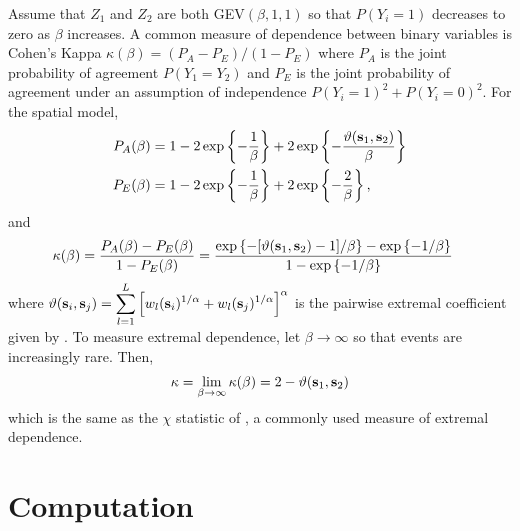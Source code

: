 \documentclass[12pt]{article}
\begin{document}
Assume that $Z_1$ and $Z_2$ are both GEV$(\beta, 1, 1)$ so that $P(Y_i = 1)$ decreases to zero as $\beta$ increases.
A common measure of dependence between binary variables is Cohen's Kappa \citep{Cohen1960} $\kappa(\beta) = (P_A - P_E) / (1 - P_E)$ where $P_A$ is the joint probability of agreement $P(Y_1 = Y_2)$ and $P_E$ is the joint probability of agreement under an assumption of independence $P(Y_i = 1)^2 + P(Y_i = 0)^2$.
For the spatial model,
\begin{align*}
P_A(\beta) &= 1 - 2 \exp\left\{ - \frac{1}{\beta} \right\} + 2 \exp\left\{- \frac{\vartheta(\mathbf{s}_1, \mathbf{s}_2)}{\beta}  \right\} \nonumber \\
P_E(\beta) &= 1 - 2 \exp \left\{ - \frac{1}{\beta} \right\} + 2 \exp \left\{ -\frac{2}{\beta} \right\}, \nonumber
\end{align*}
and
\begin{align} \label{rbeq:kappa}
\kappa(\beta) &= \frac{P_A(\beta) - P_E(\beta)}{1 - P_E(\beta)} = \frac{\exp\left\{-[\vartheta(\mathbf{s}_1, \mathbf{s}_2) - 1] / \beta \right\} - \exp \left\{ -1 / \beta \right\}}{1 - \exp \left\{ -1 / \beta \right\}}
\end{align}
where $\vartheta (\mathbf{s}_i, \mathbf{s}_j) = \displaystyle \sum_{ l = 1 }^{ L } \left[ w_{l}(\mathbf{s}_i)^{ 1/\alpha } +  w_{ l}(\mathbf{s}_j)^{ 1/\alpha } \right]^\alpha$ is the pairwise extremal coefficient given by \citet{Reich2012}.
To measure extremal dependence, let $\beta \rightarrow \infty$ so that events are increasingly rare.
Then,
\begin{align}
\kappa = \lim_{\beta \rightarrow \infty} \kappa(\beta) = 2 - \vartheta(\mathbf{s}_1, \mathbf{s}_2)
\end{align}
which is the same as the $\chi$ statistic of \citet{Coles2001}, a commonly used measure of extremal dependence.

\section{Computation}\label{rbs:comp}
\end{document}
